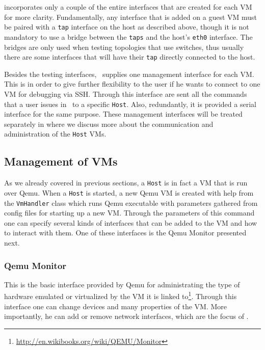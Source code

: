  incorporates only a couple of the entire interfaces that are created for each VM for more clarity.
Fundamentally, any interface that is added on a guest VM must be paired with a \texttt{tap} interface on the host as described above, though it is not mandatory to use a bridge between the \texttt{taps} and the host's \texttt{eth0} interface.
The bridges are only used when testing topologies that use switches, thus usually there are some interfaces that will have their \texttt{tap} directly connected to the host.

Besides the testing interfaces, \project\ supplies one management interface for each VM.
This is in order to give further flexibility to the user if he wants to connect to one VM for debugging via SSH.
Through this interface are sent all the commands that a user issues in \project\ to a specific \texttt{Host}.
Also, redundantly, it is provided a serial interface for the same purpose.
These management interfaces will be treated separately in  where we discuss more about the communication and administration of the \texttt{Host} VMs.

\subsection{Management of VMs}
\label{sub-sec:communication-with-vm}

As we already covered in previous sections, a \texttt{Host} is in fact a VM that is run over Qemu.
When a \texttt{Host} is started, a new Qemu VM is created with help from the \texttt{VmHandler} class which runs Qemu executable with parameters gathered from config
files for starting up a new VM.
Through the parameters of this command one can specify several kinds of interfaces that can be added to the VM and how to interact with them.
One of these interfaces is the Qemu Monitor presented next.

\subsubsection{Qemu Monitor}
\label{sub-sub-sec:qemu-monitor}

This is the basic interface provided by Qemu for administrating the type of hardware emulated or virtualized by the VM it is linked to\footnote{\url{http://en.wikibooks.org/wiki/QEMU/Monitor}}.
Through this interface one can change devices and many properties of the VM.
More importantly, he can add or remove network interfaces, which are the focus of \project.

